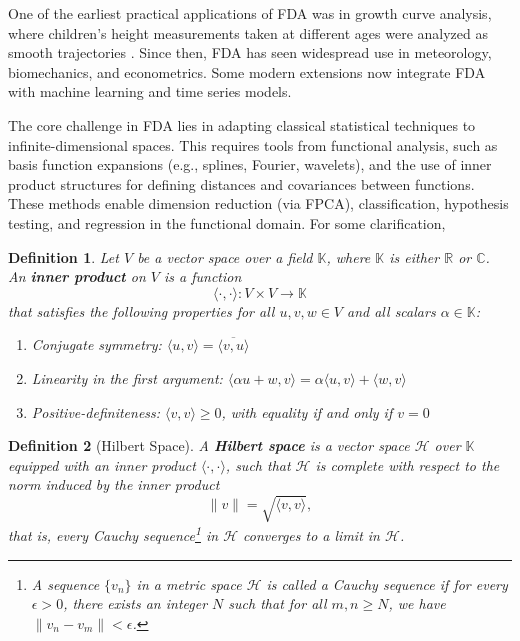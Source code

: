 \documentclass[
	12pt,				%
	oneside,			%
	a4paper,			%
	english,			%
	brazil				%
	]{abntex2ppgsi}
\newtheorem{definition}{Definition}
\begin{document}
One of the earliest practical applications of FDA was in growth curve analysis, where children’s height measurements taken at different ages were analyzed as smooth trajectories \cite{ramsay1991some}. Since then, FDA has seen widespread use in meteorology, biomechanics, and econometrics. Some modern extensions now integrate FDA with machine learning and time series models.

The core challenge in FDA lies in adapting classical statistical techniques to infinite-dimensional spaces. This requires tools from functional analysis, such as basis function expansions (e.g., splines, Fourier, wavelets), and the use of inner product structures for defining distances and covariances between functions. These methods enable dimension reduction (via FPCA), classification, hypothesis testing, and regression in the functional domain. For some clarification,

\begin{definition}
Let \( V \) be a vector space over a field \( \mathbb{K} \), where \( \mathbb{K} \) is either \( \mathbb{R} \) or \( \mathbb{C} \). An \textbf{inner product} on \( V \) is a function
\[
\langle \cdot, \cdot \rangle : V \times V \to \mathbb{K}
\]
that satisfies the following properties for all \( u, v, w \in V \) and all scalars \( \alpha \in \mathbb{K} \):

\begin{enumerate}
    \item Conjugate symmetry: \( \langle u, v \rangle = \overline{\langle v, u \rangle} \)
    \item Linearity in the first argument: \( \langle \alpha u + w, v \rangle = \alpha \langle u, v \rangle + \langle w, v \rangle \)
    \item Positive-definiteness: \( \langle v, v \rangle \geq 0 \), with equality if and only if \( v = 0 \)
\end{enumerate}
\end{definition}

\begin{definition}[Hilbert Space]
A \textbf{Hilbert space} is a vector space \( \mathcal{H} \) over \( \mathbb{K} \) equipped with an inner product \( \langle \cdot, \cdot \rangle \), such that \( \mathcal{H} \) is complete with respect to the norm induced by the inner product
\[
\|v\| = \sqrt{\langle v, v \rangle},
\]
that is, every Cauchy sequence\footnote{A sequence \( \{v_n\} \) in a metric space \( \mathcal{H} \) is called a \textit{Cauchy sequence} if for every \( \epsilon > 0 \), there exists an integer \( N \) such that for all \( m, n \geq N \), we have \( \| v_n - v_m \| < \epsilon \).} in \( \mathcal{H} \)  converges to a limit in \( \mathcal{H} \).
\end{definition}
\end{document}
